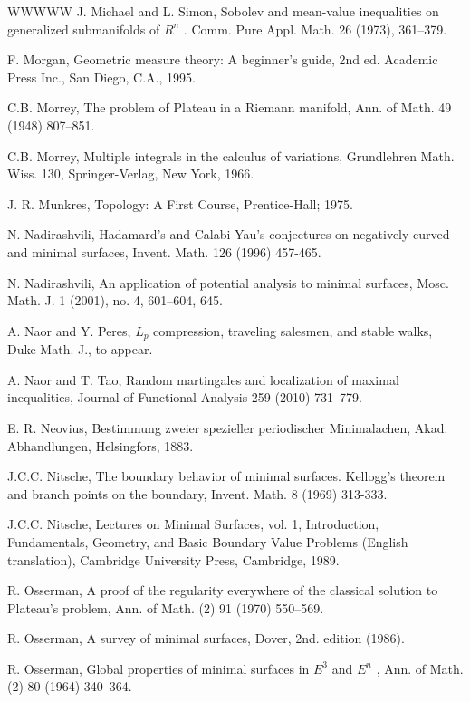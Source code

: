 \begin{thebibliography}{WWWWW}
 J. Michael and L. Simon, Sobolev and mean-value inequalities on generalized submanifolds of $R^{n}$ . Comm. Pure Appl. Math. 26 (1973), 361–379.

 F. Morgan, Geometric measure theory: A beginner's guide, 2nd ed. Academic Press Inc., San Diego, C.A., 1995.

 C.B. Morrey, The problem of Plateau in a Riemann manifold, Ann. of Math. 49 (1948) 807–851.

 C.B. Morrey, Multiple integrals in the calculus of variations, Grundlehren Math. Wiss. 130, Springer-Verlag, New York, 1966.

 J. R. Munkres, Topology: A First Course, Prentice-Hall; 1975.

 N. Nadirashvili, Hadamard's and Calabi-Yau's conjectures on negatively curved and minimal surfaces, Invent. Math. 126 (1996) 457-465.

 N. Nadirashvili, An application of potential analysis to minimal surfaces, Mosc. Math. J. 1 (2001), no. 4, 601–604, 645.

 A. Naor and Y. Peres, $L_{p}$ compression, traveling salesmen, and stable walks, Duke Math. J., to appear.

 A. Naor and T. Tao, Random martingales and localization of maximal inequalities, Journal of Functional Analysis 259 (2010) 731–779.

 E. R. Neovius, Bestimmung zweier spezieller periodischer Minimalachen, Akad. Abhandlungen, Helsingfors, 1883.

 J.C.C. Nitsche, The boundary behavior of minimal surfaces. Kellogg's theorem and branch points on the boundary, Invent. Math. 8 (1969) 313-333.

 J.C.C. Nitsche, Lectures on Minimal Surfaces, vol. 1, Introduction, Fundamentals, Geometry, and Basic Boundary Value Problems (English translation), Cambridge University Press, Cambridge, 1989.

 R. Osserman, A proof of the regularity everywhere of the classical solution to Plateau's problem, Ann. of Math. (2) 91 (1970) 550–569.

 R. Osserman, A survey of minimal surfaces, Dover, 2nd. edition (1986).

 R. Osserman, Global properties of minimal surfaces in $E^{3}$ and $E^{n}$ , Ann. of Math. (2) 80 (1964) 340–364.


\end{thebibliography}

